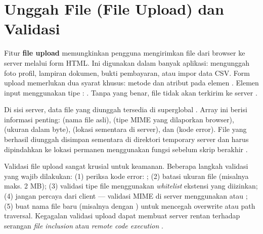 ﻿\section{Unggah File (File Upload) dan Validasi}

Fitur \textbf{file upload} memungkinkan pengguna mengirimkan file dari browser ke server melalui form HTML. Ini digunakan dalam banyak aplikasi: mengunggah foto profil, lampiran dokumen, bukti pembayaran, atau impor data CSV. Form upload memerlukan dua syarat khusus: metode  dan atribut  pada elemen . Elemen input menggunakan tipe : . Tanpa  yang benar, file tidak akan terkirim ke server \cite{phpManual}.

Di sisi server, data file yang diunggah tersedia di superglobal . Array ini berisi informasi penting:  (nama file asli),  (tipe MIME yang dilaporkan browser),  (ukuran dalam byte),  (lokasi sementara di server), dan  (kode error). File yang berhasil diunggah disimpan sementara di direktori temporary server dan harus dipindahkan ke lokasi permanen menggunakan fungsi  sebelum skrip berakhir \cite{phpRightWay}.

Validasi file upload sangat krusial untuk keamanan. Beberapa langkah validasi yang wajib dilakukan: (1) periksa kode error: ; (2) batasi ukuran file (misalnya maks. 2 MB); (3) validasi tipe file menggunakan \textit{whitelist} ekstensi yang diizinkan; (4) jangan percaya  dari client --- validasi MIME di server menggunakan  atau ; (5) buat nama file baru (misalnya dengan ) untuk mencegah overwrite atau path traversal. Kegagalan validasi upload dapat membuat server rentan terhadap serangan \textit{file inclusion} atau \textit{remote code execution} \cite{owaspXss}.

